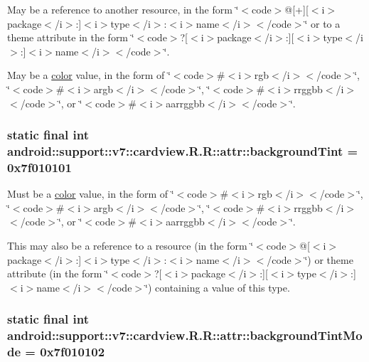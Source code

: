May be a reference to another resource, in the form \char`\"{}$<$code$>$@\mbox{[}+\mbox{]}\mbox{[}$<$i$>$package$<$/i$>$:\mbox{]}$<$i$>$type$<$/i$>$:$<$i$>$name$<$/i$>$$<$/code$>$\char`\"{} or to a theme attribute in the form \char`\"{}$<$code$>$?\mbox{[}$<$i$>$package$<$/i$>$:\mbox{]}\mbox{[}$<$i$>$type$<$/i$>$:\mbox{]}$<$i$>$name$<$/i$>$$<$/code$>$\char`\"{}. 

May be a \hyperlink{classandroid_1_1support_1_1v7_1_1cardview_1_1_r_1_1color}{color} value, in the form of \char`\"{}$<$code$>$\#$<$i$>$rgb$<$/i$>$$<$/code$>$\char`\"{}, \char`\"{}$<$code$>$\#$<$i$>$argb$<$/i$>$$<$/code$>$\char`\"{}, \char`\"{}$<$code$>$\#$<$i$>$rrggbb$<$/i$>$$<$/code$>$\char`\"{}, or \char`\"{}$<$code$>$\#$<$i$>$aarrggbb$<$/i$>$$<$/code$>$\char`\"{}. \hypertarget{classandroid_1_1support_1_1v7_1_1cardview_1_1_r_1_1attr_47d629d8d6b835ac1083dfdfa62672cd}{
\subsubsection[{backgroundTint}]{\setlength{\rightskip}{0pt plus 5cm}static final int android::support::v7::cardview.R.R::attr::backgroundTint = 0x7f010101}}
\label{classandroid_1_1support_1_1v7_1_1cardview_1_1_r_1_1attr_47d629d8d6b835ac1083dfdfa62672cd}


Must be a \hyperlink{classandroid_1_1support_1_1v7_1_1cardview_1_1_r_1_1color}{color} value, in the form of \char`\"{}$<$code$>$\#$<$i$>$rgb$<$/i$>$$<$/code$>$\char`\"{}, \char`\"{}$<$code$>$\#$<$i$>$argb$<$/i$>$$<$/code$>$\char`\"{}, \char`\"{}$<$code$>$\#$<$i$>$rrggbb$<$/i$>$$<$/code$>$\char`\"{}, or \char`\"{}$<$code$>$\#$<$i$>$aarrggbb$<$/i$>$$<$/code$>$\char`\"{}. 

This may also be a reference to a resource (in the form \char`\"{}$<$code$>$@\mbox{[}$<$i$>$package$<$/i$>$:\mbox{]}$<$i$>$type$<$/i$>$:$<$i$>$name$<$/i$>$$<$/code$>$\char`\"{}) or theme attribute (in the form \char`\"{}$<$code$>$?\mbox{[}$<$i$>$package$<$/i$>$:\mbox{]}\mbox{[}$<$i$>$type$<$/i$>$:\mbox{]}$<$i$>$name$<$/i$>$$<$/code$>$\char`\"{}) containing a value of this type. \hypertarget{classandroid_1_1support_1_1v7_1_1cardview_1_1_r_1_1attr_4dd1783577fb42ad9ff37f480d90274d}{
\subsubsection[{backgroundTintMode}]{\setlength{\rightskip}{0pt plus 5cm}static final int android::support::v7::cardview.R.R::attr::backgroundTintMode = 0x7f010102}}
\label{classandroid_1_1support_1_1v7_1_1cardview_1_1_r_1_1attr_4dd1783577fb42ad9ff37f480d90274d}


